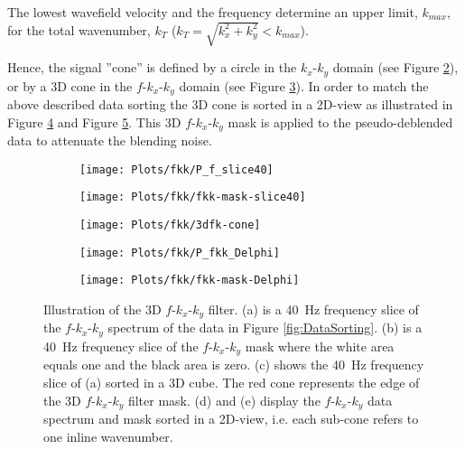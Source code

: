 \documentclass{madrid15WS}
\begin{document}
The lowest wavefield velocity and the frequency determine an upper limit, $k_{max}$, for the total wavenumber, $k_T$ ($k_{T} = \sqrt{k_x^2 + k_y^2} < k_{max}$). 


Hence, the signal ”cone” is defined by a circle in the $k_x$-$k_y$ domain (see Figure \ref{fig:FK-f_slice-mask}), or by a 3D cone in the $f$-$k_x$-$k_y$ domain (see Figure \ref{fig:FK-f_slice-data3d}). In order to match the above described data sorting the 3D cone is sorted in a 2D-view as illustrated in Figure \ref{fig:FK-delphi-data} and Figure \ref{fig:FK-delphi-mask}. This 3D $f$-$k_x$-$k_y$ mask is applied to the pseudo-deblended data to attenuate the blending noise.

\begin{figure}[h!]
	\centering
	\begin{subfigure}[t]{0.25\textwidth}
		\centering
		\texttt{[image: Plots/fkk/P\_f\_slice40]}
		\caption{}
		\label{fig:FK-f_slice-data}
	\end{subfigure}
	\centering
	\begin{subfigure}[t]{0.25\textwidth}
		\centering
		\texttt{[image: Plots/fkk/fkk-mask-slice40]}
		\caption{}
		\label{fig:FK-f_slice-mask}
	\end{subfigure}
	\centering
	\begin{subfigure}[t]{0.25\textwidth}
		\centering
		\texttt{[image: Plots/fkk/3dfk-cone]}
		\caption{}
		\label{fig:FK-f_slice-data3d}
	\end{subfigure}
	
	\begin{subfigure}[t]{\textwidth}
		\centering
		\texttt{[image: Plots/fkk/P\_fkk\_Delphi]}
		\caption{}
		\label{fig:FK-delphi-data}
	\end{subfigure}
	\par\bigskip
	\begin{subfigure}[t]{\textwidth}
		\centering
		\texttt{[image: Plots/fkk/fkk-mask-Delphi]}
		\caption{}
		\label{fig:FK-delphi-mask}
	\end{subfigure}
	
	\caption{Illustration of the 3D $f$-$k_x$-$k_y$ filter. (a) is a \SI{40}{\hertz} frequency slice of the $f$-$k_x$-$k_y$ spectrum of the data in Figure \ref{fig:DataSorting}. (b) is a \SI{40}{\hertz} frequency slice of the $f$-$k_x$-$k_y$ mask where the white area equals one and the black area is zero. (c) shows the \SI{40}{\hertz} frequency slice of (a) sorted in a 3D cube. The red cone represents the edge of the 3D $f$-$k_x$-$k_y$ filter mask. (d) and (e) display the $f$-$k_x$-$k_y$ data spectrum and mask sorted in a 2D-view, i.e. each sub-cone refers to one inline wavenumber.}
	\label{fig:FKK-Mask}

\end{figure}
\end{document}
